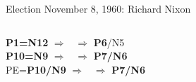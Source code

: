 \begin{frame}[t]{Election November 8, 1960: Richard Nixon}
\begin{columns}[T, onlytextwidth]
\textbf{\dgreen P1=N12} 
	$\Rightarrow$ \Sun\, $\Rightarrow$ \textbf{\dgreen P6}/N5\\
\textbf{\red P10=N9}
	$\Rightarrow$ \Venus\, $\Rightarrow$ \textbf{\dgreen P7/N6}\\
PE=\textbf{\red P10/N9}
	 $\Rightarrow$ \Venus\, $\Rightarrow$ \textbf{\dgreen P7/N6}

\end{columns}
\end{frame}
